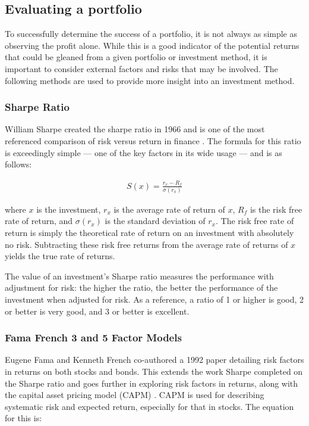 \subsection{Evaluating a portfolio}
To successfully determine the success of a portfolio, it is not always as simple as observing the profit alone. While this is a good indicator of the potential returns that could be gleaned from a given portfolio or investment method, it is important to consider external factors and risks that may be involved. The following methods are used to provide more insight into an investment method.

\subsubsection{Sharpe Ratio}
William Sharpe created the sharpe ratio in 1966 and is one of the most referenced comparison of risk versus return in finance \cite{sharpe-ratio}. The formula for this ratio is exceedingly simple --- one of the key factors in its wide usage --- and is as follows:

\begin{align*}
S(x) = \frac{r_x - R_f}{\sigma(r_x)}
\end{align*}

\noindent
where $x$ is the investment, $r_x$ is the average rate of return of $x$, $R_f$ is the risk free rate of return, and $\sigma(r_x)$ is the standard deviation of $r_x$. The risk free rate of return is simply the theoretical rate of return on an investment with absolutely no risk. Subtracting these risk free returns from the average rate of returns of $x$ yields the true rate of returns.

The value of an investment's Sharpe ratio measures the performance with adjustment for risk: the higher the ratio, the better the performance of the investment when adjusted for risk. As a reference, a ratio of 1 or higher is good, 2 or better is very good, and 3 or better is excellent. 

\subsubsection{Fama French 3 and 5 Factor Models}
Eugene Fama and Kenneth French co-authored a 1992 paper detailing risk factors in returns on both stocks and bonds. This extends the work Sharpe completed on the Sharpe ratio and goes further in exploring risk factors in returns, along with the capital asset pricing model (CAPM) \cite{ff3}. CAPM is used for describing systematic risk and expected return, especially for that in stocks. The equation for this is:

